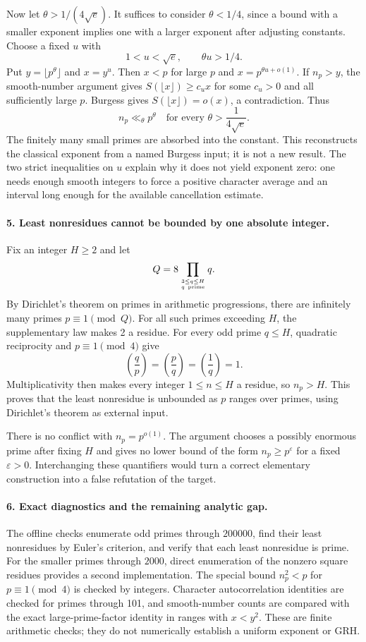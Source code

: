 \documentclass[11pt]{article}
\begin{document}
Now let $\theta>1/(4\sqrt e)$. It suffices to consider $\theta<1/4$, since a bound with a smaller exponent implies one with a larger exponent after adjusting constants. Choose a fixed $u$ with
\[
 1<u<\sqrt e,\qquad \theta u>1/4.
\]
Put $y=\lfloor p^\theta\rfloor$ and $x=y^u$. Then $x<p$ for large $p$ and $x=p^{\theta u+o(1)}$. If $n_p>y$, the smooth-number argument gives $S(\lfloor x\rfloor)\ge c_u x$ for some $c_u>0$ and all sufficiently large $p$. Burgess gives $S(\lfloor x\rfloor)=o(x)$, a contradiction. Thus
\[
 n_p\ll_\theta p^\theta
 \quad\text{for every }\theta>\frac{1}{4\sqrt e}.
\]
The finitely many small primes are absorbed into the constant. This reconstructs the classical exponent from a named Burgess input; it is not a new result. The two strict inequalities on $u$ explain why it does not yield exponent zero: one needs enough smooth integers to force a positive character average and an interval long enough for the available cancellation estimate.

\paragraph{5. Least nonresidues cannot be bounded by one absolute integer.}
Fix an integer $H\ge2$ and let
\[
 Q=8\prod_{3\le q\le H\atop q\ \mathrm{prime}}q.
\]
By Dirichlet's theorem on primes in arithmetic progressions, there are infinitely many primes $p\equiv1\pmod Q$. For all such primes exceeding $H$, the supplementary law makes 2 a residue. For every odd prime $q\le H$, quadratic reciprocity and $p\equiv1\pmod4$ give
\[
 \left(\frac qp\right)=\left(\frac pq\right)
 =\left(\frac1q\right)=1.
\]
Multiplicativity then makes every integer $1\le n\le H$ a residue, so $n_p>H$. This proves that the least nonresidue is unbounded as $p$ ranges over primes, using Dirichlet's theorem as external input.

There is no conflict with $n_p=p^{o(1)}$. The argument chooses a possibly enormous prime after fixing $H$ and gives no lower bound of the form $n_p\ge p^\varepsilon$ for a fixed $\varepsilon>0$. Interchanging these quantifiers would turn a correct elementary construction into a false refutation of the target.

\paragraph{6. Exact diagnostics and the remaining analytic gap.}
The offline checks enumerate odd primes through $200000$, find their least nonresidues by Euler's criterion, and verify that each least nonresidue is prime. For the smaller primes through $2000$, direct enumeration of the nonzero square residues provides a second implementation. The special bound $n_p^2<p$ for $p\equiv1\pmod4$ is checked by integers. Character autocorrelation identities are checked for primes through 101, and smooth-number counts are compared with the exact large-prime-factor identity in ranges with $x<y^2$. These are finite arithmetic checks; they do not numerically establish a uniform exponent or GRH.
\end{document}
